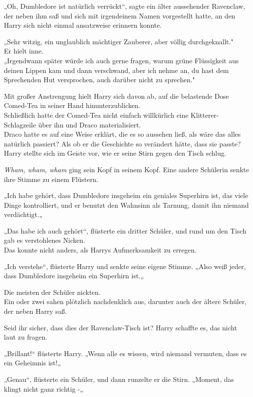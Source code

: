 {„Oh, Dumbledore ist natürlich verrückt“, sagte ein älter aussehender Ravenclaw, der neben ihm saß und sich mit irgendeinem Namen vorgestellt hatte, an den Harry sich nicht einmal ansatzweise erinnern konnte.

„Sehr witzig, ein unglaublich mächtiger Zauberer, aber völlig durchgeknallt."\\ Er hielt inne.\\ „Irgendwann später würde ich auch gerne fragen, warum grüne Flüssigkeit aus deinen Lippen kam und dann verschwand, aber ich nehme an, du hast dem Sprechenden Hut versprochen, auch darüber nicht zu sprechen."

Mit großer Anstrengung hielt Harry sich davon ab, auf die belastende Dose Comed-Tea in seiner Hand hinunterzublicken.\\ Schließlich hatte der Comed-Tea nicht einfach willkürlich eine Klitterer-Schlagzeile über ihn und Draco materialisiert.\\ Draco hatte es auf eine Weise erklärt, die es so aussehen ließ, als wäre das alles natürlich passiert? Als ob er die Geschichte so verändert hätte, dass sie passte? Harry stellte sich im Geiste vor, wie er seine Stirn gegen den Tisch schlug.

\emph{Wham, wham, wham} ging sein Kopf in seinem Kopf. Eine andere Schülerin senkte ihre Stimme zu einem Flüstern.

„Ich habe gehört, dass Dumbledore insgeheim ein geniales Superhirn ist, das viele Dinge kontrolliert, und er benutzt den Wahnsinn als Tarnung, damit ihn niemand verdächtigt.„

„Das habe ich auch gehört“, flüsterte ein dritter Schüler, und rund um den Tisch gab es verstohlenes Nicken.\\ Das konnte nicht anders, als Harrys Aufmerksamkeit zu erregen.

„Ich verstehe“, flüsterte Harry und senkte seine eigene Stimme. „Also weiß jeder, dass Dumbledore insgeheim ein Superhirn ist.„

Die meisten der Schüler nickten.\\ Ein oder zwei sahen plötzlich nachdenklich aus, darunter auch der ältere Schüler, der neben Harry saß.

Seid ihr sicher, dass dies der Ravenclaw-Tisch ist? Harry schaffte es, das nicht laut zu fragen.

„Brillant!“ flüsterte Harry. „Wenn alle es wissen, wird niemand vermuten, dass es ein Geheimnis ist!„

„Genau“, flüsterte ein Schüler, und dann runzelte er die Stirn. „Moment, das klingt nicht ganz richtig -„

}
